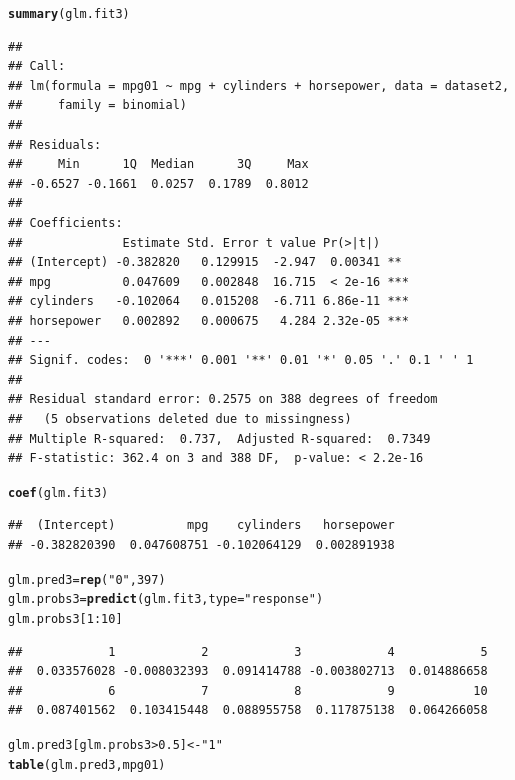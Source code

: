 \documentclass{article}\usepackage[]{graphicx}\usepackage[]{color}
\makeatletter
\newcommand{\hlnum}[1]{\textcolor[rgb]{0.686,0.059,0.569}{#1}}%
\newcommand{\hlstr}[1]{\textcolor[rgb]{0.192,0.494,0.8}{#1}}%
\newcommand{\hlopt}[1]{\textcolor[rgb]{0,0,0}{#1}}%
\newcommand{\hlstd}[1]{\textcolor[rgb]{0.345,0.345,0.345}{#1}}%
\newcommand{\hlkwb}[1]{\textcolor[rgb]{0.69,0.353,0.396}{#1}}%
\newcommand{\hlkwc}[1]{\textcolor[rgb]{0.333,0.667,0.333}{#1}}%
\newcommand{\hlkwd}[1]{\textcolor[rgb]{0.737,0.353,0.396}{\textbf{#1}}}%
\newenvironment{kframe}{%
 \def\at@end@of@kframe{}%
 \ifinner\ifhmode%
  \def\at@end@of@kframe{\end{minipage}}%
  \begin{minipage}{\columnwidth}%
 \fi\fi%
 \def\FrameCommand##1{\hskip\@totalleftmargin \hskip-\fboxsep
 \colorbox{shadecolor}{##1}\hskip-\fboxsep
     \hskip-\linewidth \hskip-\@totalleftmargin \hskip\columnwidth}%
 \MakeFramed {\advance\hsize-\width
   \@totalleftmargin\z@ \linewidth\hsize
   \@setminipage}}%
 {\par\unskip\endMakeFramed%
 \at@end@of@kframe}
\newenvironment{knitrout}{}{} %
\makeatother
\begin{document}
\begin{enumerate}[(a)]
\begin{knitrout}
\begin{kframe}
{\ttfamily\noindent\color{warningcolor}{\#\# Warning in lm.fit(x, y, offset = offset, singular.ok = singular.ok, ...): extra argument 'family' is disregarded.}}\begin{alltt}
\hlkwd{summary}\hlstd{(glm.fit3)}
\end{alltt}
\begin{verbatim}
## 
## Call:
## lm(formula = mpg01 ~ mpg + cylinders + horsepower, data = dataset2, 
##     family = binomial)
## 
## Residuals:
##     Min      1Q  Median      3Q     Max 
## -0.6527 -0.1661  0.0257  0.1789  0.8012 
## 
## Coefficients:
##              Estimate Std. Error t value Pr(>|t|)    
## (Intercept) -0.382820   0.129915  -2.947  0.00341 ** 
## mpg          0.047609   0.002848  16.715  < 2e-16 ***
## cylinders   -0.102064   0.015208  -6.711 6.86e-11 ***
## horsepower   0.002892   0.000675   4.284 2.32e-05 ***
## ---
## Signif. codes:  0 '***' 0.001 '**' 0.01 '*' 0.05 '.' 0.1 ' ' 1
## 
## Residual standard error: 0.2575 on 388 degrees of freedom
##   (5 observations deleted due to missingness)
## Multiple R-squared:  0.737,	Adjusted R-squared:  0.7349 
## F-statistic: 362.4 on 3 and 388 DF,  p-value: < 2.2e-16
\end{verbatim}
\begin{alltt}
\hlkwd{coef}\hlstd{(glm.fit3)}
\end{alltt}
\begin{verbatim}
##  (Intercept)          mpg    cylinders   horsepower 
## -0.382820390  0.047608751 -0.102064129  0.002891938
\end{verbatim}
\begin{alltt}
\hlstd{glm.pred3}\hlkwb{=}\hlkwd{rep}\hlstd{(}\hlstr{"0"}\hlstd{,} \hlnum{397}\hlstd{)}
\hlstd{glm.probs3}\hlkwb{=}\hlkwd{predict}\hlstd{(glm.fit3,}\hlkwc{type}\hlstd{=}\hlstr{"response"}\hlstd{)}
\hlstd{glm.probs3[}\hlnum{1}\hlopt{:}\hlnum{10}\hlstd{]}
\end{alltt}
\begin{verbatim}
##            1            2            3            4            5 
##  0.033576028 -0.008032393  0.091414788 -0.003802713  0.014886658 
##            6            7            8            9           10 
##  0.087401562  0.103415448  0.088955758  0.117875138  0.064266058
\end{verbatim}
\begin{alltt}
\hlstd{glm.pred3[glm.probs3}\hlopt{>}\hlnum{0.5}\hlstd{]}\hlkwb{<-}\hlstr{"1"}
\hlkwd{table}\hlstd{(glm.pred3,mpg01)}
\end{alltt}
\begin{verbatim}

\end{verbatim}
\end{kframe}
\end{knitrout}
\end{enumerate}
\end{document}
